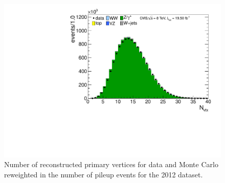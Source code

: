 \begin{figure}[hbt]
\begin{center}
\includegraphics[width=0.7\linewidth]{figures/nvtx.pdf}
\caption{\label{fig:PUValidation_Full2012}Number of reconstructed primary vertices for data and Monte Carlo reweighted in the number 
of pileup events for the 2012 dataset.}
\end{center}
\end{figure}


